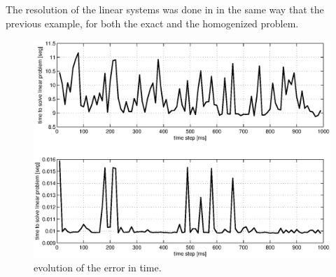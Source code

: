 The resolution of the linear systems was done in in the same way that the previous example, for both the exact and the homogenized problem.

\begin{figure}[H]
\centering
\includegraphics[height = 8 cm]{fig/numerical_example_MDE_exp3_benchmark}
\caption{evolution of the error in time.}
\end{figure}